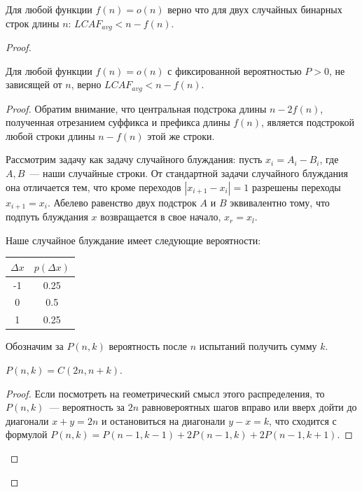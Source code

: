 \begin{theorem} %
Для любой функции $f(n)=o(n)$ верно что для двух случайных бинарных строк длины $n$: $LCAF_{avg} < n - f(n)$.
\end{theorem}
\begin{proof}

\begin{lemma}
Для любой функции $f(n)=o(n)$ с фиксированной вероятностью $P>0$, не зависящей от $n$, верно $LCAF_{avg} < n - f(n)$.
\end{lemma}

\begin{proof}
Обратим внимание, что центральная подстрока длины $n-2f(n)$, полученная отрезанием суффикса и префикса длины $f(n)$, является подстрокой любой строки длины $n-f(n)$ этой же строки.

Рассмотрим задачу как задачу случайного блуждания: пусть $x_i = A_i - B_i$, где $A, B$~--- наши случайные строки. От стандартной задачи случайного блуждания она отличается тем, что кроме переходов $|x_{i+1}-x_i|=1$ разрешены переходы $x_{i+1}=x_i$. Абелево равенство двух подстрок $A$ и $B$ эквивалентно тому, что подпуть блуждания $x$ возвращается в свое начало, $x_r=x_l$.

Наше случайное блуждание имеет следующие вероятности:

\begin{tabular}{|c|c|}
\hline
$\Delta x$ & $p(\Delta x)$ \\
\hline
-1 & 0.25 \\
\hline
0 & 0.5 \\
\hline
1 & 0.25 \\
\hline
\end{tabular}

Обозначим за $P(n, k)$ вероятность после $n$ испытаний получить сумму $k$. 

\begin{lemma}
$P(n, k)=C(2n, n+k)$.
\end{lemma}
\begin{proof}

Если посмотреть на геометрический смысл этого распределения, то $P(n,k)$~--- вероятность за $2n$ равновероятных шагов вправо или вверх дойти до диагонали $x+y=2n$ и остановиться на диагонали $y-x=k$, что сходится с формулой $P(n,k)=P(n-1,k-1)+2P(n-1,k)+2P(n-1,k+1)$.


\end{proof}
\end{proof}
\end{proof}
